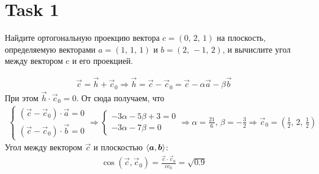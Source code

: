 \section{Task 1}
\begin{task}
    Найдите ортогональную проекцию вектора $c = (0,\, 2,\, 1)$ на плоскость, определяемую векторами $a = (1,\, 1,\, 1)$ и $b = (2,\, −1,\, 2)$, и вычислите угол между вектором c и его проекцией.
\end{task}

\begin{solution}
    \begin{gather}
        \vec{c} = \vec{h} + \vec{c}_0 \Longrightarrow \vec{h} = \vec{c} - \vec{c}_0 = \vec{c} - \alpha \vec{a} - \beta\vec{b}        
    \end{gather}
    При этом $\vec{h}\cdot \vec{c}_0 = 0$.
    От сюда получаем, что
    \begin{gather}
        \begin{cases}
            (\vec{c} - \vec{c}_0) \cdot \vec{a} = 0 \\
            (\vec{c} - \vec{c}_0) \cdot \vec{b} = 0
        \end{cases} \Longrightarrow 
        \begin{cases}
            -3\alpha - 5\beta + 3 = 0\\
            -3\alpha - 7\beta = 0
        \end{cases} \Longrightarrow \alpha = \frac{21}{6},\,\beta=-\frac{3}{2} \Longrightarrow \vec{c}_0 = \left(\frac12,\, 2,\, \frac12\right)
    \end{gather}
    Угол между вектором $\vec{c}$ и плоскостью $\braket{\boldsymbol{a},\boldsymbol{b}}$:
    \begin{gather}
        \cos(\vec{c},\vec{c}_0) = \frac{\vec{c}\cdot\vec{c}_0}{cc_0} = \sqrt{0.9}
    \end{gather}
\end{solution}